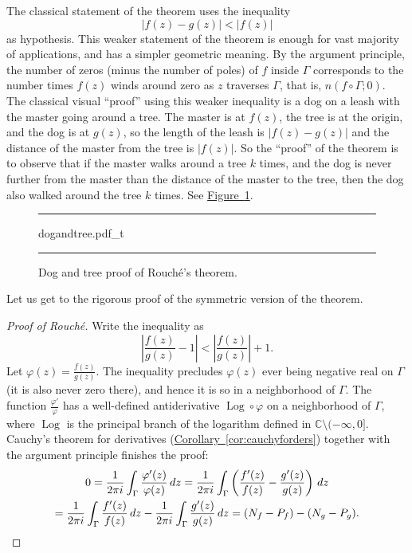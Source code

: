 \documentclass[12pt,openany]{book}
\newcommand{\Log}{\operatorname{Log}}
\newcommand{\sabs}[1]{\lvert {#1} \rvert}
\newcommand{\abs}[1]{\left\lvert {#1} \right\rvert}
\newcommand{\C}{{\mathbb{C}}}
\newcommand{\myquote}[1]{``#1''}
\theoremstyle{plain}
\theoremstyle{remark}
\theoremstyle{definition}
\newenvironment{myfig}{%
\begin{figure}[h!t]
\noindent\rule{\textwidth}{0.5pt}\vspace{12pt}\par\centering}%
{\par\noindent\rule{\textwidth}{0.5pt}
\end{figure}}
\theoremstyle{exercise}
\theoremstyle{example}
\newcommand{\figureref}[1]{\hyperref[#1]{Figure~\ref*{#1}}}
\newcommand{\corref}[1]{\hyperref[#1]{Corollary~\ref*{#1}}}
\begin{document}
The classical statement of the theorem uses the
inequality
\begin{equation*}
\sabs{f(z)-g(z)} < \sabs{f(z)}
\end{equation*}
as hypothesis.
This weaker statement of the theorem is enough for vast majority of
applications, and has a simpler geometric meaning.
By the argument principle, the number of zeros (minus the number of poles) of $f$
inside $\Gamma$ corresponds to the number times $f(z)$ winds around zero
as $z$ traverses $\Gamma$, that is, $n(f \circ \Gamma;0)$.
The classical visual \myquote{proof} using this weaker
inequality is a dog on a leash
with the master going around a tree.  The master is at $f(z)$, the tree is
at the origin, and the dog is at $g(z)$, so the length of the leash is
$\sabs{f(z)-g(z)}$ and the distance of the master from the tree is
$\sabs{f(z)}$.  So the \myquote{proof} of the theorem is to observe that if the
master walks around a tree $k$ times, and the dog is never further from the
master than the distance of the master to the tree, then the dog also walked
around the tree $k$ times.  See \figureref{fig:dogandtree}.

\begin{myfig}
{dogandtree.pdf_t}
\caption{Dog and tree proof of Rouch\'e's theorem.\label{fig:dogandtree}}
\end{myfig}

Let us get to the rigorous proof of the symmetric version of the
theorem.

\begin{proof}[Proof of Rouch\'e]
Write the inequality as
\begin{equation*}
\abs{\frac{f(z)}{g(z)} - 1} <
\abs{\frac{f(z)}{g(z)}} + 1 .
\end{equation*}
Let $\varphi(z) = \frac{f(z)}{g(z)}$.
The inequality precludes $\varphi(z)$ ever being negative real on
$\Gamma$ (it is also never zero there),
and hence it is so in a neighborhood of $\Gamma$.
The function
$\frac{\varphi'}{\varphi}$ has a well-defined antiderivative
$\Log \circ \varphi$ on a neighborhood of $\Gamma$, where $\Log$ is
the principal branch of the logarithm defined in $\C \setminus (-\infty,0]$.
Cauchy's theorem for derivatives (\corref{cor:cauchyforders})
together with the argument principle finishes the proof:
\begin{multline*}
0
= \frac{1}{2\pi i} \int_{\Gamma} \frac{\varphi'(z)}{\varphi(z)} \, dz
=
\frac{1}{2\pi i} \int_{\Gamma}
\left( \frac{f'(z)}{f(z)} - \frac{g'(z)}{g(z)} \right) \, dz 
\\
=
\frac{1}{2\pi i} \int_{\Gamma}
\frac{f'(z)}{f(z)} \, dz 
-
\frac{1}{2\pi i} \int_{\Gamma}
\frac{g'(z)}{g(z)} \, dz 
=
(N_f - P_f) - (N_g - P_g) .
\qedhere
\end{multline*}
\end{proof}
\end{document}
